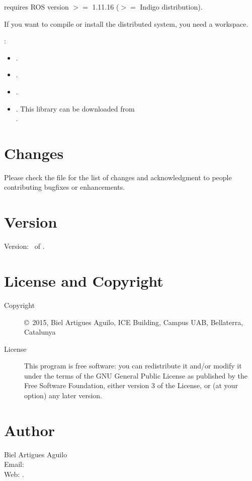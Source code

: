\documentclass[a4paper,english]{article}
\begin{document}
\begin{description}\setlength{\itemsep}{0cm}
\item[ROS Environment]  requires ROS version $>=$ 1.11.16 ($>=$ Indigo distribution).
\item[ROS Workspace] If you want to compile or install the distributed system, you need a  workspace.
\item[Libraries]: 
	\begin{itemize}
		\item {}.
		\item {}.
		\item {}.
		\item {}. This library can be downloaded from \\ .
	\end{itemize}
\end{description}

\section{Changes}
Please check the file  for the list of changes and
acknowledgment to people contributing bugfixes or enhancements.

\section{Version}

Version: \Version\ of \Date.

\section{License and Copyright}

\begin{description}
\item[Copyright] \copyright\ 2015, Biel Artigues Aguilo,
     ICE Building, Campus UAB, Bellaterra, Catalunya\\

\item[License] This program is free software: you can redistribute it and/or modify
    it under the terms of the GNU General Public License as published by
    the Free Software Foundation, either version 3 of the License, or
    (at your option) any later version.

\end{description}

\section{Author}

\noindent
Biel Artigues Aguilo                      \\
Email:   \\
Web: .

\LatexManEnd
\end{document}
